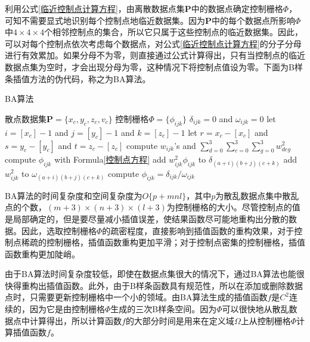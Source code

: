 利用公式\ref{临近控制点计算方程}，由离散数据点集$ \mathbf{P} $中的数据点确定控制栅格$ \Phi $，可知不需要显式地识别每个控制点地临近数据集。因为$ \mathbf{P} $中的每个数据点所影响$ \Phi $中$ 4 \times 4 \times 4 $个相邻控制点的集合，所以它只属于这些控制点的临近数据集。因此，可以对每个控制点依次考虑每个数据点，对公式\ref{临近控制点计算方程}的分子分母进行有效累加。如果分母不为零，则直接通过公式计算得出，只有当控制点的临近数据点集为空时，才会出现分母为零，这种情况下将控制点值设为零。下面为B样条插值方法的伪代码，称之为BA算法。
\begin{algorithm}[h]
    \caption{BA算法}
    \begin{algorithmic}[1] %
        \Require 散点数据集$ \mathbf{P} = \{ x_{c}, y_{c}, z_{c}, v_{c} \} $
        \Ensure 控制栅格$ \Phi = \{ \phi_{ijk} \} $
        \State $ \delta_{ijk} = 0 $ and $ \omega_{ijk} = 0 $
        \EndFor
        \State let $ i = \left[ x_{c} \right] - 1 $ and $ j = \left[ y_{c} \right] - 1 $ and $ k = \left[ z_{c} \right] - 1 $
        \State let $ r = x_{c} - \left[ x_{c} \right] $ and $ s = y_{c} - \left[ y_{c} \right] $ and $ t = z_{c} - \left[ z_{c} \right] $
        \State compute $ w_{ijk} $'s and $ \sum_{d=0}^{3}\sum_{e=0}^{3}\sum_{g=0}^{3}w_{deg}^{2} $
        \State compute $ \phi_{ijk} $ with Formula\ref{控制点方程}
        \State add $ w_{ijk}^{2}\phi_{ijk} $ to $ \delta_{\left( a+i \right)\left( b+j \right)\left( c+k \right)} $
        \State add $ w_{ijk}^{2} $ to $ \omega_{\left( a+i \right)\left( b+j \right)\left( c+k \right)} $
        \EndFor
        \EndFor
        \State compute $ \phi_{ijk} = \delta_{ijk} / \omega_{ijk} $
        \EndIf
        \EndFor
    \end{algorithmic}
\end{algorithm}

BA算法的时间复杂度和空间复杂度为$ O\{ p + mnl \} $，其中$ p $为散乱数据点集中散乱点的个数，$ \left( m+3 \right) \times \left( n+3 \right) \times \left( l+3 \right) $为控制栅格的大小。尽管控制点的值是局部确定的，但是要尽量减小插值误差，使结果函数尽可能地重构出分散的数据。因此，选取控制栅格$ \Phi $的疏密程度，直接影响到插值函数的重构效果，对于控制点稀疏的控制栅格，插值函数重构更加平滑；对于控制点密集的控制栅格，插值函数重构更加陡峭。

由于BA算法时间复杂度较低，即使在数据点集很大的情况下，通过BA算法也能很快得重构出插值函数。此外，由于B样条函数具有规范性，所以在添加或删除数据点时，只需要更新控制栅格中一个小的领域。由BA算法生成的插值函数$ f $是$C^{2}$连续的，因为它是由控制栅格$ \Phi $生成的三次B样条空间。因为$ \Phi $可以很快地从散乱数据点中计算得出，所以计算函数$ f $的大部分时间是用来在定义域$ \Omega $上从控制栅格$ \Phi $计算插值函数$ f $。

